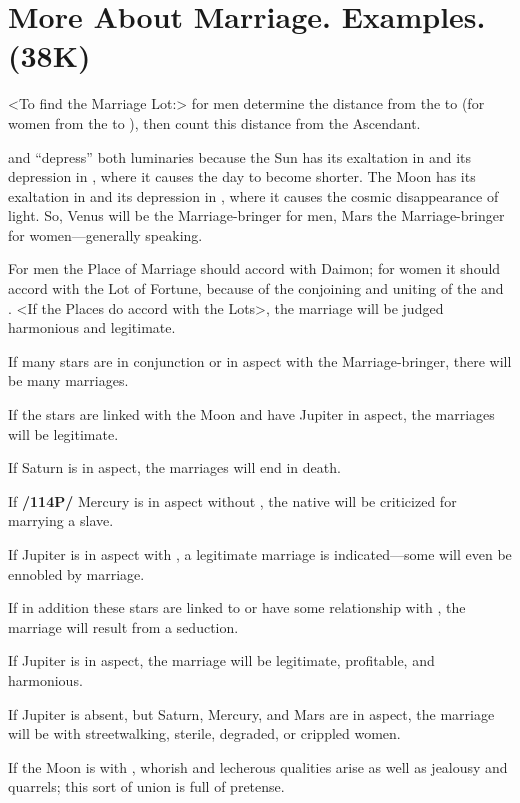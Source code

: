 \section{More About Marriage. Examples. (38K)}

<To find the Marriage Lot:> for men determine the distance from the \Sun\xspace to \Venus\xspace (for women from the \Moon\xspace to \Mars), then count this distance from the Ascendant. 

\Venus\xspace and \Mars\xspace “depress” both luminaries because the Sun has its exaltation in \Aries\xspace and its depression in \Libra, where it causes the day to become shorter. The Moon has its exaltation in \Taurus\xspace and its depression in \Scorpio, where it causes the cosmic disappearance of light. So, Venus will be the Marriage-bringer for men, Mars the Marriage-bringer for women—generally speaking. 

For men the Place of Marriage should accord with Daimon; for women it should accord with the Lot of Fortune, because of the conjoining and uniting of the \Sun\xspace and \Moon. <If the
Places do accord with the Lots>, the marriage will be judged harmonious and legitimate. 

If many stars are in conjunction or in aspect with the Marriage-bringer, there will be many marriages. 

If the stars are linked with the Moon and have Jupiter in aspect, the marriages will be legitimate. 

If Saturn is in aspect, the marriages will end in death. 

If \textbf{/114P/} Mercury is in aspect without \Jupiter, the native will be criticized for marrying a slave. 

If Jupiter is in aspect with \Saturn, a legitimate marriage is indicated—some will even be ennobled by marriage. 

If in addition these stars are linked to or have some relationship with \Venus, the marriage will result from a seduction. 

If Jupiter is in aspect, the marriage will be legitimate, profitable, and harmonious. 

If Jupiter is absent, but Saturn, Mercury, and Mars are in aspect, the marriage will be with streetwalking, sterile, degraded, or crippled women. 

If the Moon is with \Venus, whorish and lecherous qualities arise as well as jealousy and quarrels; this sort of union is full of pretense. 

